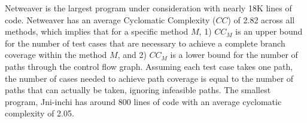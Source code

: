 Netweaver is the largest program under consideration with nearly 18K lines of code.  Netweaver has an average Cyclomatic Complexity ($CC$) of 2.82 across all methods, which implies that for a specific method $M$, 1) $CC_M$ is an upper bound for the number of test cases that are necessary to achieve a complete branch coverage within the method $M$, and 2) $CC_M$ is a lower bound for the number of paths through the control flow graph. Assuming each test case takes one path, the number of cases needed to achieve path coverage is equal to the number of paths that can actually be taken, ignoring infeasible paths.  The smallest program, Jni-inchi has around 800 lines of code with an average cyclomatic complexity of 2.05.  

\begin{table}[!t]
\caption{Benchmark Programs and their Properties}
\label{tbl:program_table}
\end{table}

